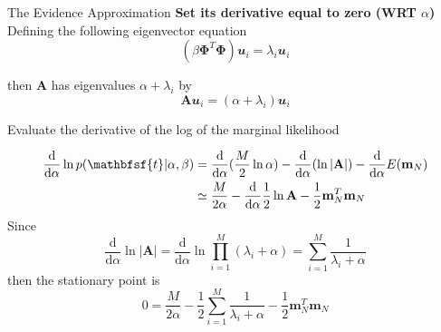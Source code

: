 \documentclass{bredelebeamer}
\begin{document}
\begin{frame}{The Evidence Approximation}
  \textbf{Set its derivative equal to zero (WRT $\alpha$)} \\
  Defining the following eigenvector equation
  \begin{equation}
    (\beta\boldsymbol{\Phi}^T \boldsymbol{\Phi}) \mathbfit{u}_i = \lambda_i \mathbfit{u}_i
  \end{equation}

  then $\mathbf{A}$ has eigenvalues $\alpha + \lambda_i$ by
  \begin{equation}
     \mathbf{A} \mathbfit{u}_i = (\alpha + \lambda_i) \mathbfit{u}_i
  \end{equation}

  Evaluate the derivative of the log of the marginal likelihood

  \begin{equation}
    \begin{split}
      \frac{\mathrm{d}}{\mathrm{d}\alpha} \ln p(\mathbfsf{t}|\alpha, \beta)
      &= \frac{\mathrm{d}}{\mathrm{d}\alpha} (\frac{M}{2} \ln{\alpha})
      - \frac{\mathrm{d}}{\mathrm{d}\alpha} (\ln{|\mathbf{A}|})
      - \frac{\mathrm{d}}{\mathrm{d}\alpha} E(\mathbf{m}_N) \\
      &\simeq \frac{M}{2\alpha}
      - \frac{\mathrm{d}}{\mathrm{d} \alpha} \frac{1}{2} \ln{\mathbf{A}}
      - \frac{1}{2} \mathbf{m}_N^T \mathbf{m}_N
    \end{split}
  \end{equation}
  Since
  \begin{equation}
    \frac{\mathrm{d}}{\mathrm{d}\alpha} \ln{|\mathbf{A}|}
    = \frac{\mathrm{d}}{\mathrm{d}\alpha} \ln{\prod_{i=1}^{M} (\lambda_i + \alpha)}
    = \sum_{i=1}^M \frac{1}{\lambda_i + \alpha}
  \end{equation}
  then the stationary point is
  \begin{equation}
    0 = \frac{M}{2\alpha} - \frac{1}{2} \sum_{i=1}^{M} \frac{1}{\lambda_i + \alpha} - \frac{1}{2} \mathbf{m}_N^T\mathbf{m}_N
  \end{equation}
\end{frame}
\end{document}
